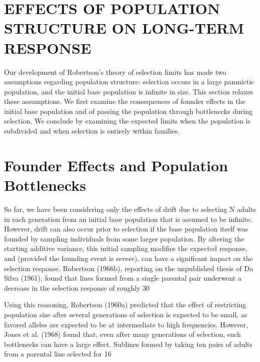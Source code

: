 \documentclass{article}
\begin{document}
{\section{EFFECTS OF POPULATION STRUCTURE ON LONG-TERM RESPONSE}
Our development of Robertson’s theory of selection limits has made two assumptions regarding population structure: selection occurs in a large panmictic population, and the initial base population is infinite in size. This section relaxes these assumptions. We first examine the consequences of founder effects in the initial base population and of passing the population through bottlenecks during selection. We conclude by examining the expected limits when the population is subdivided and when selection is entirely within families.

\section{Founder Effects and Population Bottlenecks}
So far, we have been considering only the effects of drift due to selecting N adults in each generation from an initial base population that is assumed to be infinite. However, drift can also occur prior to selection if the base population itself was founded by sampling individuals from some larger population. By altering the starting additive variance, this initial sampling modifies the expected response, and (provided the founding event is severe), can have a significant impact on the selection response. Robertson (1966b), reporting on the unpublished thesis of Da Silva (1961), found that lines formed from a single parental pair underwent a decrease in the selection response of roughly 30%

Using this reasoning, Robertson (1960a) predicted that the effect of restricting population size after several generations of selection is expected to be small, as favored alleles are expected to be at intermediate to high frequencies. However, Jones et al. (1968) found that, even after many generations of selection, such bottlenecks can have a large effect. Sublines formed by taking ten pairs of adults from a parental line selected for 16

}
\end{document}
